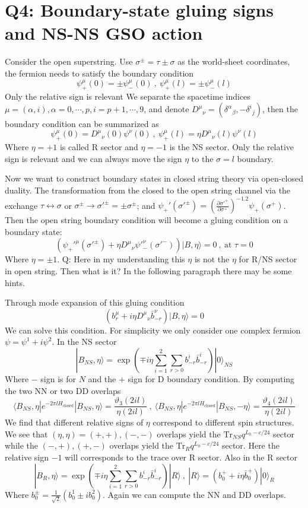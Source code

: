 \documentclass[
  10pt,
  a4paper,
  openany]{book}
\begin{document}
\section{Q4: Boundary-state gluing signs and NS-NS GSO
action}\label{q4-boundary-state-gluing-signs-and-ns-ns-gso-action}

Consider the open superstring. Use \(\sigma^{\pm}=\tau\pm\sigma\) as the
world-sheet coordinates, the fermion needs to satisfy the boundary
condition \[
\psi_{+}^\mu(0)=\pm \psi^\mu_{-}(0)\ , \ \psi_{+}^\mu(l)=\pm \psi_{-}^\mu(l)
\] Only the relative sign is relevant We separate the spacetime indices
\(\mu=(\alpha,i),\alpha=0,\cdots,p,i=p+1,\cdots,9\), and denote
\({D^\mu}_{\nu}=({\delta^\alpha}_{\beta},-{\delta^i}_{j})\), then the
boundary condition can be summarized as \[
\psi_{+}^\mu(0)={D^\mu}_{\nu}(0)\psi^\nu(0) \ , \ \psi_{+}^\mu(l)=\eta{D^\mu}_{\nu}(l)\psi^\nu(l) 
\] Where \(\eta=+1\) is called R sector and \(\eta=-1\) is the NS
sector. Only the relative sign is relevant and we can always move the
sign \(\eta\) to the \(\sigma=l\) boundary.

Now we want to construct boundary states in closed string theory via
open-closed duality. The transformation from the closed to the open
string channel via the exchange \(\tau\leftrightarrow\sigma\) or
\(\sigma^{\pm}\to\sigma'^{\pm}=\pm\sigma^{\pm}\); and
\(\psi_{+}'(\sigma'^{\pm})=\left( \frac{{\partial\sigma'^+}}{\partial\sigma^+} \right)^{-1.2}\psi_{+}(\sigma^+)\).
Then the open string boundary condition will become a gluing condition
on a boundary state: \[
(\psi_{+}'^\mu(\sigma'^{\pm})+\eta {D^\mu}_{\nu}\psi'^\nu_{-}(\sigma'^-))|B,\eta \rangle=0 \ , \ \text{at }\tau=0
\] Where \(\eta=\pm 1\). Q: Here in my understanding this \(\eta\) is
not the \(\eta\) for R/NS sector in open string. Then what is it? In the
following paragraph there may be some hints.

Through mode expansion of this gluing condition \[
(b_{r}^\mu+i\eta {D^\mu}_{\nu}\bar{b}^\nu_{-r})|B,\eta \rangle=0
\] We can solve this condition. For simplicity we only consider one
complex fermion \(\psi=\psi^1+i\psi^2\). In the NS sector \[
|B_{NS},\eta \rangle=\exp\left( \mp i\eta \sum_{i=1}^2\sum_{r>0}b_{-r}^i \bar{b}^i_{-r} \right)|0\rangle_{NS}
\] Where \(-\) sign is for \(N\) and the \(+\) sign for D boundary
condition. By computing the two NN or two DD overlaps \[
\langle B_{NS},\eta|e^{-2\pi lH_{\text{closed}}}|B_{NS},\eta \rangle=\frac{\vartheta_{3}(2il)}{\eta(2il)} \ , \ 
\langle B_{NS},\eta|e^{-2\pi lH_{\text{closed}}}|B_{NS},-\eta \rangle=\frac{\vartheta_{4}(2il)}{\eta(2il)}
\] We find that different relative signs of \(\eta\) correspond to
different spin structures. We see that \((\eta,\eta)=(+,+),(-,-)\)
overlaps yield the \(\mathrm{Tr}_{NS}q^{L_{0}-c/24}\) sector while the
\((-,+),(+,-)\) overlaps yield the \(\mathrm{Tr}_{R}q^{L_{0}-c/24}\)
sector. Here the relative sign \(-1\) will corresponds to the trace over
R sector. Also in the R sector \[
|B_{R},\eta \rangle=\exp\left( \mp i\eta \sum_{i=1}^2\sum_{r>0}b_{-r}^i \bar{b}^i_{-r} \right)|R\rangle \ , \ |R\rangle=(b_{0}^++i\eta \bar{b}^+_{0})|0\rangle_{R}
\] Where \(b_{0}^{\pm}=\frac{1}{\sqrt{ 2 }}(b_{0}^1\pm ib_{0}^2)\).
Again we can compute the NN and DD overlaps.
\end{document}
